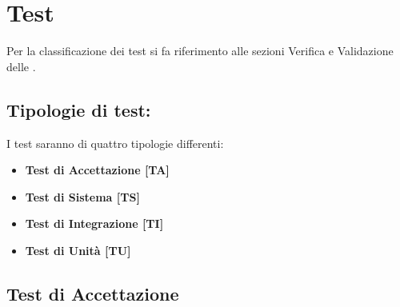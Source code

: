 \section{Test}
	Per la classificazione dei test si fa riferimento alle sezioni Verifica e Validazione delle .
	

	\subsection{Tipologie di test:}
		I test saranno di quattro tipologie differenti:
		\begin{itemize}

			\item \textbf{Test di Accettazione [TA]}
			\item \textbf{Test di Sistema [TS]}
			\item \textbf{Test di Integrazione [TI]}
			\item \textbf{Test di Unità [TU]}

		\end{itemize}

	\subsection{Test di Accettazione}
		
